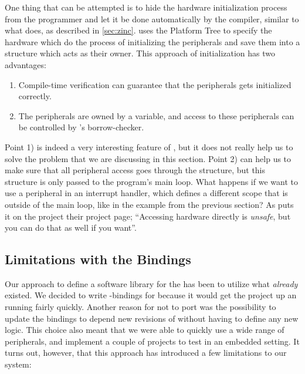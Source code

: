 One thing that can be attempted is to hide the hardware initialization process from the programmer and let it be done automatically by the compiler, similar to what {\zinc} does, as described in \autoref{sec:zinc}.
{\zinc} uses the Platform Tree to specify the hardware which do the process of initializing the peripherals and save them into a  structure which acts as their owner.
This approach of initialization has two advantages:

\begin{enumerate}[\hspace{13}1)]
    \item Compile-time verification can guarantee that the peripherals gets initialized correctly.
    \item The peripherals are owned by a variable, and access to these peripherals can be controlled by {\rust}'s borrow-checker.
\end{enumerate}

Point 1) is indeed a very interesting feature of {\zinc}, but it does not really help us to solve the problem that we are discussing in this section.
Point 2) can help us to make sure that all peripheral access goes through the  structure, but this structure is only passed to the program's main loop.
What happens if we want to use a peripheral in an interrupt handler, which defines a different scope that is outside of the main loop, like in the example from the previous section?
As {\zinc} puts it on the project their project page; ``Accessing hardware directly is \emph{unsafe}, but you can do that as well if you want''.

\subsection{Limitations with the Bindings}

Our approach to define a software library for the {\gecko} has been to utilize what \emph{already} existed.
We decided to write {\rust}-bindings for {\emlib} because it would get the project up an running fairly quickly.
Another reason for not to port {\emlib} was the possibility to update the bindings to depend new revisions of {\emlib} without having to define any new logic.
This choice also meant that we were able to quickly use a wide range of peripherals, and implement a couple of projects to test {\rust} in an embedded setting.
It turns out, however, that this approach has introduced a few limitations to our system:

